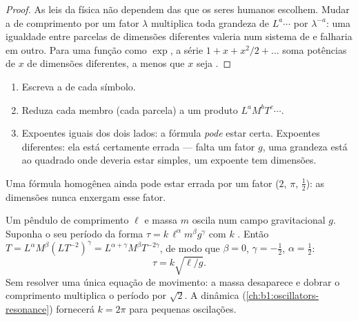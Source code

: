 \begin{proof}
As leis da física não dependem das  que os seres humanos escolhem.
Mudar a  de comprimento por um fator $\lambda$ multiplica toda
grandeza de  $L^a \cdots$ por $\lambda^{-a}$: uma igualdade entre
parcelas de dimensões diferentes valeria num sistema de  e
falharia em outro. Para uma função como $\exp$, a série
$1 + x + x^2/2 + \dots$ soma potências de $x$ de dimensões diferentes,
a menos que $x$ seja .
\end{proof}

\begin{method}\label{met:b1:units-dimensions:check}
\begin{enumerate}
  \item Escreva a  de cada símbolo.
  \item Reduza cada membro (cada parcela) a um produto $L^a M^b T^c \cdots$.
  \item Expoentes iguais dos dois lados: a fórmula \emph{pode} estar certa.
        Expoentes diferentes: ela está certamente errada --- falta um fator
        $g$, uma grandeza está ao quadrado onde deveria estar simples, um
        expoente tem dimensões.
\end{enumerate}
Uma fórmula homogênea ainda pode estar errada por um fator 
($2$, $\pi$, $\tfrac12$): as dimensões nunca enxergam esse fator.
\end{method}

\begin{example}\label{ex:b1:units-dimensions:pendulum}
Um pêndulo de comprimento $\ell$ e massa $m$ oscila num campo gravitacional
$g$. Suponha o seu período da forma $\tau = k\,\ell^\alpha m^\beta g^\gamma$
com $k$ . Então $T = L^\alpha M^\beta (L T^{-2})^\gamma =
L^{\alpha+\gamma} M^\beta T^{-2\gamma}$, de modo que $\beta = 0$,
$\gamma = -\tfrac12$, $\alpha = \tfrac12$:
\[
\tau = k\sqrt{\ell/g} .
\]
Sem resolver uma única equação de movimento: a massa desaparece e dobrar
o comprimento multiplica o período por $\sqrt2$. A dinâmica
(\cref{ch:b1:oscillators-resonance}) fornecerá $k = 2\pi$ para pequenas
oscilações.
\end{example}

